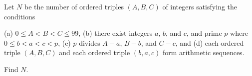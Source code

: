 Let $N$ be the number of ordered triples $(A,B,C)$ of integers satisfying the conditions

(a) $0\leq A<B<C\leq99$,
(b) there exist integers $a$, $b$, and $c$, and prime $p$ where $0\leq b < a < c < p$,
(c) $p$ divides $A-a$, $B-b$, and $C-c$, and
(d) each ordered triple $(A,B,C)$ and each ordered triple $(b,a,c)$ form arithmetic sequences.

Find $N$.